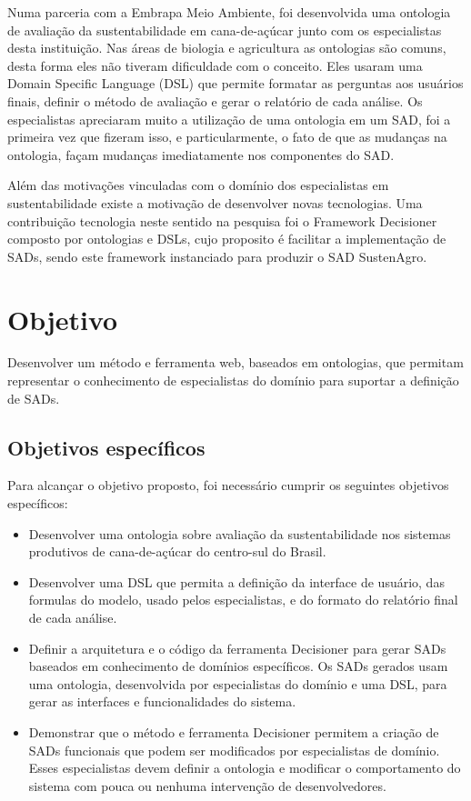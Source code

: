 Numa parceria com a Embrapa Meio Ambiente, foi desenvolvida uma ontologia
de avaliação da sustentabilidade em cana-de-açúcar junto com os especialistas
desta instituição. Nas áreas de biologia e agricultura as ontologias
são comuns, desta forma eles não tiveram dificuldade com o conceito.
Eles usaram uma \foreignlanguage{english}{Domain Specific Language}
(DSL) que permite formatar
as perguntas aos usuários finais, definir o método de avaliação e
gerar o relatório de cada análise. Os especialistas apreciaram muito
a utilização de uma ontologia em um SAD, foi a primeira vez que fizeram
isso, e particularmente, o fato de que as mudanças na ontologia, façam
mudanças imediatamente nos componentes do SAD.

Além das motivações vinculadas com o domínio dos especialistas em
sustentabilidade existe a motivação de desenvolver novas tecnologias.
Uma contribuição tecnologia neste sentido na pesquisa foi o Framework
Decisioner composto por ontologias e \foreignlanguage{english}{DSLs},
cujo proposito é facilitar a implementação de SADs, sendo este framework
instanciado para produzir o SAD SustenAgro.

\section{Objetivo}

Desenvolver um método e ferramenta web, baseados em ontologias, que
permitam representar o conhecimento de especialistas do domínio para
suportar a definição de SADs. 

\subsection*{Objetivos específicos}

Para alcançar o objetivo proposto, foi necessário cumprir os seguintes
objetivos específicos: 
\begin{itemize}
\item Desenvolver uma ontologia sobre avaliação da sustentabilidade nos
sistemas produtivos de cana-de-açúcar do centro-sul do Brasil.
\item Desenvolver uma DSL que permita a definição da interface de usuário,
das formulas do modelo, usado pelos especialistas, e do formato do
relatório final de cada análise.
\item Definir a arquitetura e o código da ferramenta Decisioner para gerar
SADs baseados em conhecimento de domínios específicos. Os SADs gerados
usam uma ontologia, desenvolvida por especialistas do domínio e uma
DSL, para gerar as interfaces e funcionalidades do sistema.
\item Demonstrar que o método e ferramenta Decisioner permitem a criação
de SADs funcionais que podem ser modificados por especialistas de
domínio. Esses especialistas devem definir a ontologia e modificar
o comportamento do sistema com pouca ou nenhuma intervenção de desenvolvedores.
\end{itemize}

